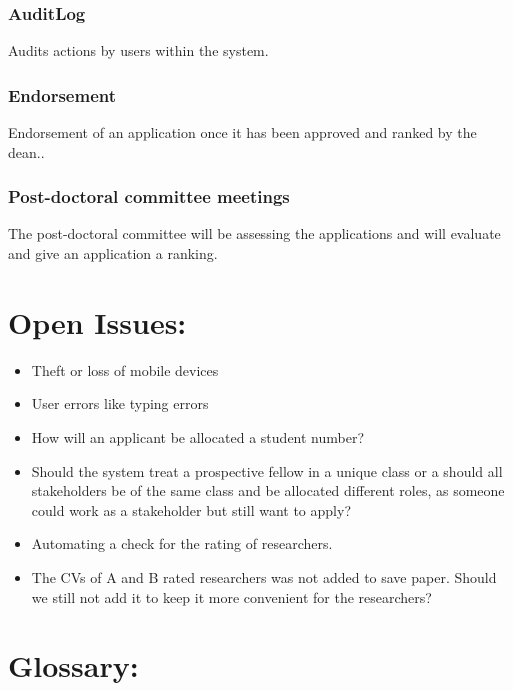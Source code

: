 \documentclass[12pt]{article}
\begin{document}
\subsubsection{AuditLog}
Audits actions by users within the system.

\subsubsection{Endorsement}
Endorsement of an application once it has been approved and ranked by the dean..

\subsubsection{Post-doctoral committee meetings}
The post-doctoral committee will be assessing the applications and will evaluate and give an application a ranking.

\newpage	
\section{Open Issues:} %
\vspace{0.2in}

\begin{itemize}
\item Theft or loss of mobile devices
\item User errors like typing errors
\item How will an applicant be allocated a student number?
\item Should the system treat a prospective fellow in a unique class or a should all stakeholders be of the same class and be allocated different roles, as someone could work as a stakeholder but still want to apply?
\item Automating a check for the rating of researchers.
\item The CVs of A and B rated researchers was not added to save paper. Should we still not add it to keep it more convenient for the researchers?
\end{itemize}


\vspace{0.5in}

\newpage
\section{Glossary:} %
\vspace{0.2in}
\end{document}
